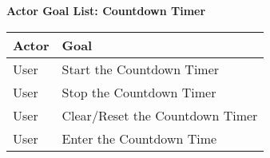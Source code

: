 \documentclass[letterpaper]{article}
\begin{document}
\noindent
\begin{center}
\textbf{Actor Goal List:  Countdown Timer}

\vspace{2ex}
\begin{tabular}{|p{3.5cm}|p{5cm}|}\hline
\textbf{Actor} & \textbf{Goal}\\\hline
User & Start the Countdown Timer\\\hline
User & Stop the Countdown Timer\\\hline
User & Clear/Reset the Countdown Timer\\\hline
User & Enter the Countdown Time\\\hline
\end{tabular}
\end{center}
\end{document}
